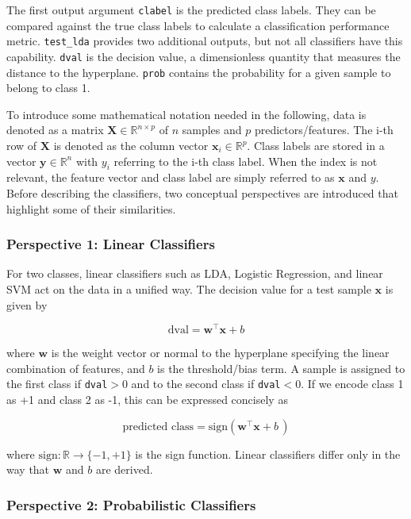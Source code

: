 \documentclass[utf8]{frontiersSCNS} %
\newcommand{\w}{\mathbf{w}}
\newcommand{\x}{\mathbf{x}}
\newcommand{\R}{\mathbb{R}}
\newcommand{\X}{\mathbf{X}}
\newcommand{\ttt}[1]{\texttt{#1}}
\begin{document}
The first output argument \ttt{clabel} is the predicted class labels. They can be compared against the true class labels to calculate a classification performance metric. \ttt{test\_lda} provides two additional outputs, but not all classifiers have this capability. \ttt{dval} is the decision value, a dimensionless quantity that measures the distance to the hyperplane. \ttt{prob} contains the probability for a given sample to belong to class 1.

To introduce some mathematical notation needed in the following, data is denoted as a matrix $\X\in\R^{n \times p}$ of $n$ samples and $p$ predictors/features. The i-th row of $\X$ is denoted as the column vector $\x_i\in\R^p$. Class labels are stored in a vector $\mathbf{y}\in\R^n$ with $y_i$ referring to the i-th class label. When the index is not relevant, the feature vector and class label are simply referred to as $\x$ and $y$. Before describing the classifiers, two conceptual perspectives are introduced that highlight some of their similarities.

\subsubsection{Perspective 1: Linear Classifiers}

For two classes, linear classifiers such as LDA, Logistic Regression, and linear SVM act on the data in a unified way. The decision value for a test sample $\x$ is given by

\begin{equation}
\label{eq:linear_dval}
\text{dval} = \w^\top\x + b
\end{equation}

where $\w$ is the weight vector or normal to the hyperplane specifying the linear combination of features, and $b$ is the threshold/bias term.  A sample is assigned to the first class if \ttt{dval}$>0$ and to the second class if \ttt{dval}$<0$. If we encode class 1 as +1 and class 2 as -1, this can be expressed concisely as

\begin{equation*}
\text{predicted class} =\text{sign} \left(\w^\top\x + b\,\right)
\end{equation*}

where $\text{sign}:\R\rightarrow\{-1,+1\}$ is the sign function. Linear classifiers differ only in the way that $\w$ and $b$ are derived.

\subsubsection{Perspective 2: Probabilistic Classifiers}
\end{document}
